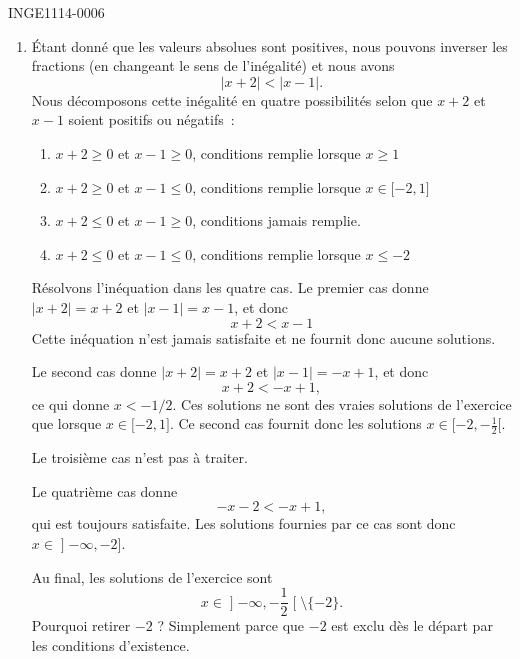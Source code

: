\begin{corrige}{INGE1114-0006}
\begin{enumerate}
		\item
			Étant donné que les valeurs absolues sont positives, nous pouvons inverser les fractions (en changeant le sens de l'inégalité) et nous avons
			\begin{equation}
				| x+2 |<| x-1 |.
			\end{equation}
			Nous décomposons cette inégalité en quatre possibilités selon que $x+2$ et $x-1$ soient positifs ou négatifs~:
			\begin{enumerate}
				\item $x+2\geq0$ et $x-1\geq0$, conditions remplie lorsque $x\geq 1$
				\item $x+2\geq0$ et $x-1\leq0$, conditions remplie lorsque $x\in\mathopen[ -2 , 1 \mathclose]$
				\item $x+2\leq0$ et $x-1\geq0$, conditions jamais remplie.
				\item $x+2\leq0$ et $x-1\leq0$, conditions remplie lorsque $x\leq-2$
			\end{enumerate}
			Résolvons l'inéquation dans les quatre cas. Le premier cas donne $| x+2 |=x+2$ et $| x-1 |=x-1$, et donc
			\begin{equation}
				x+2<x-1
			\end{equation}
			Cette inéquation n'est jamais satisfaite et ne fournit donc aucune solutions.

			Le second cas donne $| x+2 |=x+2$ et $| x-1 |=-x+1$, et donc
			\begin{equation}
				x+2<-x+1,
			\end{equation}
			ce qui donne $x<-1/2$. Ces solutions ne sont des vraies solutions de l'exercice que lorsque $x\in\mathopen[ -2 , 1 \mathclose]$. Ce second cas fournit donc les solutions $x\in\mathopen[ -2 , -\frac{1}{ 2 } [$.

			Le troisième cas n'est pas à traiter.

			Le quatrième cas donne
			\begin{equation}
				-x-2<-x+1,
			\end{equation}
			qui est toujours satisfaite. Les solutions fournies par ce cas sont donc $x\in\mathopen] -\infty , -2 \mathclose]$.

			Au final, les solutions de l'exercice sont
			\begin{equation}
				x\in\mathopen] -\infty , -\frac{ 1 }{ 2 } \mathclose[\setminus\{ -2 \}.
			\end{equation}
			Pourquoi retirer $-2$ ? Simplement parce que $-2$ est exclu dès le départ par les conditions d'existence.



\end{enumerate}
\end{corrige}
